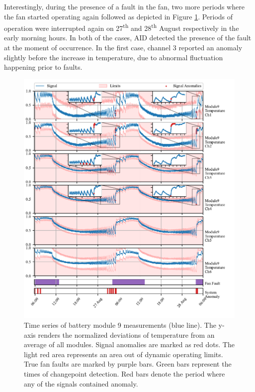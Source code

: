 Interestingly, during the presence of a fault in the fan, two more periods where the fan started operating again followed as depicted in Figure \ref{fig:kokam_second}. Periods of operation were interrupted again on 27\textsuperscript{th} and 28\textsuperscript{th} August respectively in the early morning hours. In both of the cases, AID detected the presence of the fault at the moment of occurrence. In the first case, channel 3 reported an anomaly slightly before the increase in temperature, due to abnormal fluctuation happening prior to faults.

\begin{figure}[htbp]
 \centerline{\includegraphics{figures/Kokam_thresh_second_zoom.pdf}}
 \caption{Time series of battery module 9 measurements (blue line). The y-axis renders the normalized deviations of temperature from an average of all modules. Signal anomalies are marked as red dots. The light red area represents an area out of dynamic operating limits. True fan faults are marked by purple bars. Green bars represent the times of changepoint detection. Red bars denote the period where any of the signals contained anomaly.}
 \label{fig:kokam_second}
\end{figure}

